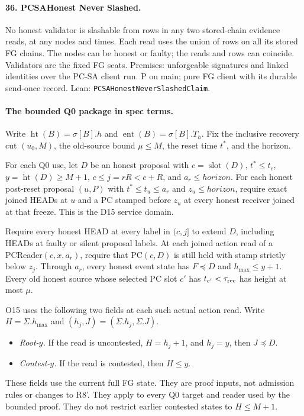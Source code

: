 \documentclass{article}
\newcommand{\slot}{\operatorname{slot}}
\newcommand{\hmax}{h_{\max}}
\newcommand{\nm}[1]{\nolinkurl{#1}}
\begin{document}
\paragraph{36. PCSAHonest Never Slashed.}
No honest validator is slashable from rows in any two stored-chain evidence reads, at any nodes and times. Each read uses the union of rows on all its stored FG chains. The nodes can be honest or faulty; the reads and rows can coincide. Validators are the fixed FG seats. Premises: unforgeable signatures and linked identities over the PC-SA client run. P on main; pure FG client with its durable send-once record.
Lean: \nm{PCSAHonestNeverSlashedClaim}.

\paragraph{The bounded Q0 package in spec terms.}
Write $\operatorname{ht}(B)=\sigma[B].h$ and
$\operatorname{ent}(B)=\sigma[B].T_h$.
Fix the inclusive recovery cut $(u_0,M)$, the old-source bound
$\mu\leq M$, the reset time $t^*$, and the horizon.

For each Q0 use, let $D$ be an honest proposal with
$c=\slot(D)$, $t^*\leq t_c$, $y=\operatorname{ht}(D)\geq M+1$,
$c\leq j=rR<c+R$, and $a_r\leq\mathit{horizon}$.
For each honest post-reset proposal $(u,P)$ with
$t^*\leq t_u\leq a_r$ and $z_u\leq\mathit{horizon}$, require
exact joined HEADs at $u$ and a PC stamped before $z_u$ at every
honest receiver joined at that freeze. This is the D15 service domain.

Require every honest HEAD at every label in $(c,j]$ to extend $D$,
including HEADs at faulty or silent proposal labels.
At each joined action read of a PCReader$(c,x,a_r)$, require that
PC$(c,D)$ is still held with stamp strictly below $z_j$.
Through $a_r$, every honest event state has $F\preceq D$ and
$\hmax\leq y+1$. Every old honest source whose selected PC slot
$c'$ has $t_{c'}<\tau_{\rm rec}$ has height at most $\mu$.

O15 uses the following two fields at each such actual action read.
Write $H=\Sigma.\hmax$ and $(h_j,J)=(\Sigma.h_j,\Sigma.J)$.
\begin{itemize}
\item \emph{Root-$y$.} If the read is uncontested,
$H=h_j+1$, and $h_j=y$, then $J\preceq D$.
\item \emph{Contest-$y$.} If the read is contested, then $H\leq y$.
\end{itemize}
These fields use the current full FG state.
They are proof inputs, not admission rules or changes to R8'.
They apply to every Q0 target and reader used by the bounded proof.
They do not restrict earlier contested states to $H\leq M+1$.
\end{document}
